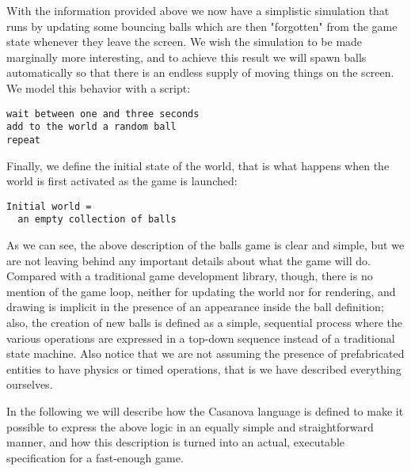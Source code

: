 With the information provided above we now have a simplistic simulation that runs by updating some bouncing balls which are then "forgotten" from the game state whenever they leave the screen. We wish the simulation to be made marginally more interesting, and to achieve this result we will spawn balls automatically so that there is an endless supply of moving things on the screen. We model this behavior with a script:

\begin{lstlisting}
wait between one and three seconds
add to the world a random ball
repeat
\end{lstlisting}

Finally, we define the initial state of the world, that is what happens when the world is first activated as the game is launched:

\begin{lstlisting}
Initial world = 
  an empty collection of balls
\end{lstlisting}

As we can see, the above description of the balls game is clear and simple, but we are not leaving behind any important details about what the game will do. Compared with a traditional game development library, though, there is no mention of the game loop, neither for updating the world nor for rendering, and drawing is implicit in the presence of an appearance inside the ball definition; also, the creation of new balls is defined as a simple, sequential process where the various operations are expressed in a top-down sequence instead of a traditional state machine. Also notice that we are not assuming the presence of prefabricated entities to have physics or timed operations, that is we have described everything ourselves.

In the following we will describe how the Casanova language is defined to make it possible to express the above logic in an equally simple and straightforward manner, and how this description is turned into an actual, executable specification for a fast-enough game.
